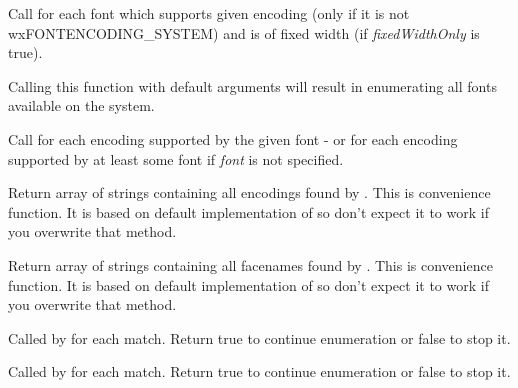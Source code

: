 
\label{wxfontenumeratorenumeratefacenames}


Call  for each font which
supports given encoding (only if it is not wxFONTENCODING\_SYSTEM) and is of
fixed width (if {\it fixedWidthOnly} is true).

Calling this function with default arguments will result in enumerating all
fonts available on the system.

\label{wxfontenumeratorenumerateencodings}


Call  for each
encoding supported by the given font - or for each encoding supported by at
least some font if {\it font} is not specified.


\label{wxfontenumeratorgetencodings}


Return array of strings containing all encodings found by 
. This is convenience function. It is 
based on default implementation of  so don't expect
it to work if you overwrite that method.

\label{wxfontenumeratorgetfacenames}


Return array of strings containing all facenames found by 
. This is convenience function. It is 
based on default implementation of  so don't expect
it to work if you overwrite that method.


\label{wxfontenumeratoronfacename}


Called by  for
each match. Return true to continue enumeration or false to stop it.

\label{wxfontenumeratoronfontencoding}


Called by  for
each match. Return true to continue enumeration or false to stop it.

